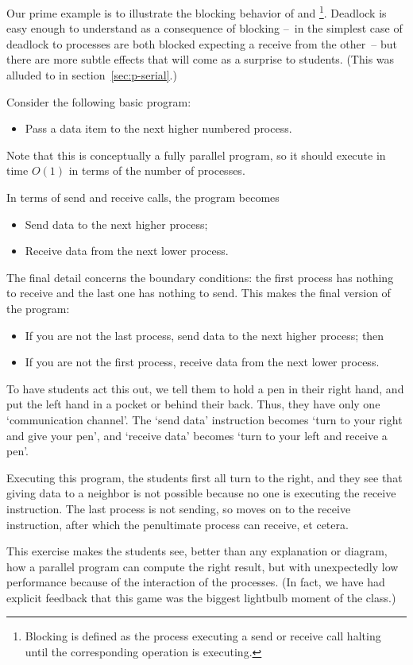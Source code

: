 Our prime example is to illustrate the blocking behavior of
 and \footnote{Blocking is defined as the
  process executing a send or receive call halting until the
  corresponding operation is executing.}. Deadlock is easy enough to
understand as a consequence of blocking --~in the simplest case of
deadlock to processes are both blocked expecting a receive from the
other~-- but there are more subtle effects that will come as a
surprise to students. (This was alluded to in section~\ref{sec:p-serial}.)

Consider the following basic program:
\begin{itemize}
\item Pass a data item to the next higher numbered process.
\end{itemize}
Note that this is conceptually a fully parallel program, so it should
execute in time $O(1)$ in terms of the number of processes.

In terms of send and receive calls, the program becomes 
\begin{itemize}
\item Send data to the next higher process;
\item Receive data from the next lower process.
\end{itemize}
The final detail concerns the boundary conditions: the first process
has nothing to receive and the last one has nothing to send. This
makes the final version of the program:
\begin{itemize}
\item If you are not the last process, send data to the next higher
  process; then
\item If you are not the first process, receive data from the next
  lower process.
\end{itemize}
To have students act this out, we tell them to hold a pen in their
right hand, and put the left hand in a pocket or behind their
back. Thus, they have only one `communication channel'. The `send
data' instruction becomes `turn to your right and give your pen', and
`receive data' becomes `turn to your left and receive a pen'.

Executing this program, the students first all turn to the right, and
they see that giving data to a neighbor is not possible because no
one is executing the receive instruction. The last process is not
sending, so moves on to the receive instruction, after which the
penultimate process can receive, et cetera.

This exercise makes the students see, better than any explanation or
diagram, how a parallel program can compute the right result, but with
unexpectedly low performance because of the interaction of the processes.
(In fact, we have had explicit feedback that this game was
the biggest lightbulb moment of the class.)

